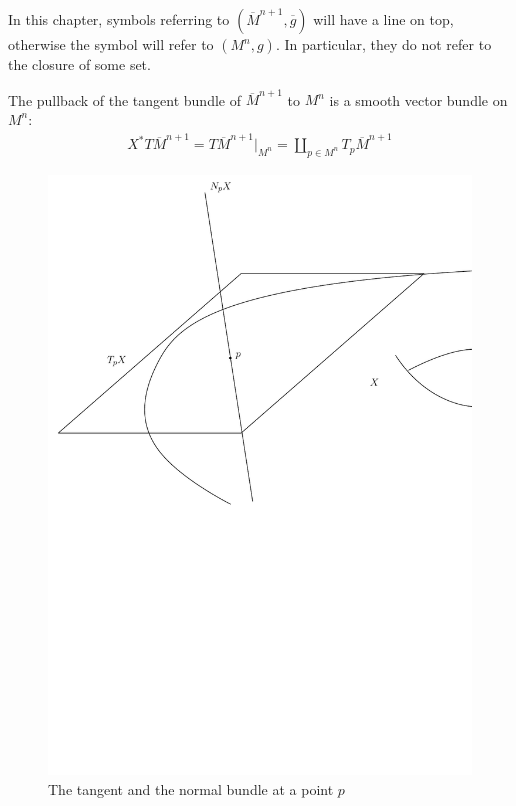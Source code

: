 In this chapter, symbols referring to $(\overline{M}^{n+1}, \overline{g})$ will have a line on top, otherwise the symbol will refer to $(M^{n}, g)$. In particular, they do not refer to the closure of some set. 


The pullback of the tangent bundle of $\overline{M}^{n+1}$ to
$M^{n}$ is a smooth vector bundle on $M^{n}$:
\begin{align*}
	X^{*}T\overline{M}^{n+1}=T\overline{M}^{n+1}|_{M^n}= \amalg_{p \in M^n} T_p\overline{M}^{n+1}
\end{align*} 

\begin{figure}
	\centering
	\includegraphics[width=\textwidth]{figures/2_tangent_and_normal_bundles}
	\caption{The tangent and the normal bundle at a point $p$}
\end{figure}


